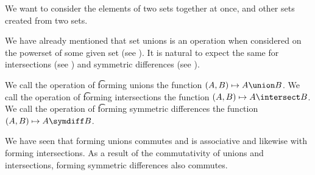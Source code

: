 

We want to consider the elements of two sets
together at once, and other sets created
from two sets.


We have already mentioned that set unions is an operation when considered on the powerset of some given set (see ).
It is natural to expect the same for intersections (see ) and symmetric differences (see ).

We call the operation of \t{forming unions} the function $(A, B) \mapsto A \union B$.
We call the operation of \t{forming intersections} the function $(A, B) \mapsto A \intersect B$.
We call the operation of \t{forming symmetric differences} the function $(A, B) \mapsto A \symdiff B$.

We have seen that forming unions commutes and is associative and likewise with forming intersections.
As a result of the commutativity of unions and intersections, forming symmetric differences also commutes.
%

%



